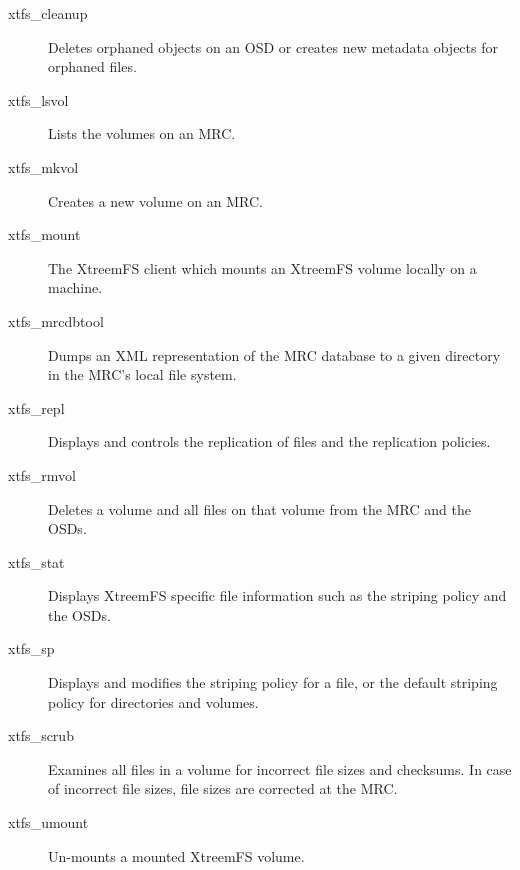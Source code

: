 \documentclass[a4paper,10pt]{book}
\begin{document}
\begin{description}
 \item[xtfs\_cleanup] Deletes orphaned objects on an OSD or creates new metadata objects for orphaned files.
 \item[xtfs\_lsvol] Lists the volumes on an MRC.
 \item[xtfs\_mkvol] Creates a new volume on an MRC.
 \item[xtfs\_mount] The XtreemFS client which mounts an XtreemFS volume locally on a machine.
 \item[xtfs\_mrcdbtool] Dumps an XML representation of the MRC database to a given directory in the MRC's local file system.
 \item[xtfs\_repl] Displays and controls the replication of files and the replication policies.
 \item[xtfs\_rmvol] Deletes a volume and all files on that volume from the MRC and the OSDs.
 \item[xtfs\_stat] Displays XtreemFS specific file information such as the striping policy and the OSDs.
 \item[xtfs\_sp] Displays and modifies the striping policy for a file, or the default striping policy for directories and volumes.
 \item[xtfs\_scrub] Examines all files in a volume for incorrect file sizes and checksums. In case of incorrect file sizes, file sizes are corrected at the MRC.
 \item[xtfs\_umount] Un-mounts a mounted XtreemFS volume.
 \end{description}

\printindex
\end{document}
